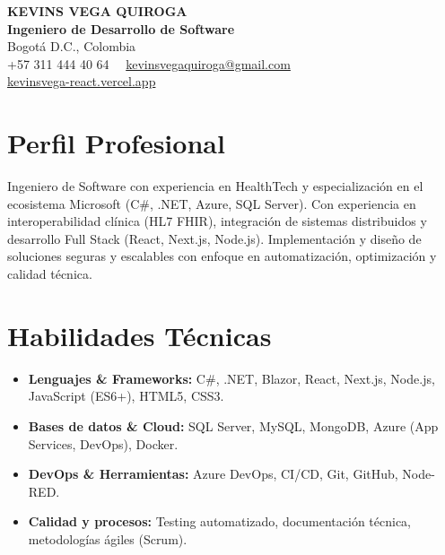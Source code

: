 \documentclass[11pt,a4paper]{article}
\begin{document}
\begin{center}
    {\Huge \textbf{KEVINS VEGA QUIROGA}} \\ \vspace{4pt}
    {\Large \textbf{Ingeniero de Desarrollo de Software }} \\
    Bogotá D.C., Colombia \\
    +57 311 444 40 64 \ \textbullet \ \href{mailto:kevinsvegaquiroga@gmail.com}{kevinsvegaquiroga@gmail.com} \\
    \href{https://kevinsvega-react.vercel.app}{kevinsvega-react.vercel.app}
\end{center}




\vspace*{-0.8em} 

\section{Perfil Profesional}
Ingeniero de Software con experiencia en HealthTech y especialización en el ecosistema Microsoft (C\#, .NET, Azure, SQL Server). Con experiencia en interoperabilidad clínica (HL7 FHIR), integración de sistemas distribuidos y desarrollo Full Stack (React, Next.js, Node.js). Implementación y diseño de soluciones seguras y escalables con enfoque en automatización, optimización y calidad técnica.

\section{Habilidades Técnicas}
\begin{itemize}[noitemsep, topsep=0pt]
    \item \textbf{Lenguajes \& Frameworks:} C\#, .NET, Blazor, React, Next.js, Node.js, JavaScript (ES6+), HTML5, CSS3.
    \item \textbf{Bases de datos \& Cloud:} SQL Server, MySQL, MongoDB, Azure (App Services, DevOps), Docker.
    \item \textbf{DevOps \& Herramientas:} Azure DevOps, CI/CD, Git, GitHub, Node-RED.
    \item \textbf{Calidad y procesos:} Testing automatizado, documentación técnica, metodologías ágiles (Scrum).
\end{itemize}
\end{document}
